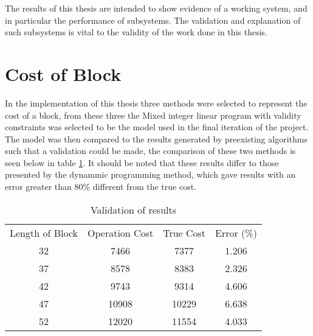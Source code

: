 
The results of this thesis are intended to show evidence of a working system, and in particular the performance of subsystems. The validation and explanation of such subsystems is vital to the validity of the work done in this thesis. 
\section{Cost of Block}
In the implementation of this thesis three methods were selected to represent the cost of a block, from these three the Mixed integer linear program with validity constraints was selected to be the model used in the final iteration of the project. The model was then compared to the results generated by preexisting algorithms\cite{A*Search} such that a validation could be made, the comparison of these two methods is seen below in table \ref{tableres}. It should be noted that these results differ to those presented by the dynammic programming method, which gave results with an error greater than 80\% different from the true cost.

\begin{table}
\caption{Validation of results}
\label{tableres}
 \begin{tabular}{|c| c| c|c|} 
 \hline
 Length of Block & Operation Cost& True Cost & Error (\%)\\ 
 32 & 7466 & 7377 & 1.206\\ 
 \hline
 37 & 8578 & 8383 & 2.326 \\
 \hline
 42 & 9743 & 9314 & 4.606 \\
 \hline
 47 & 10908 & 10229 & 6.638 \\
 \hline
 52 & 12020 & 11554 & 4.033\\ 
 \hline
\end{tabular}
\end{table}



